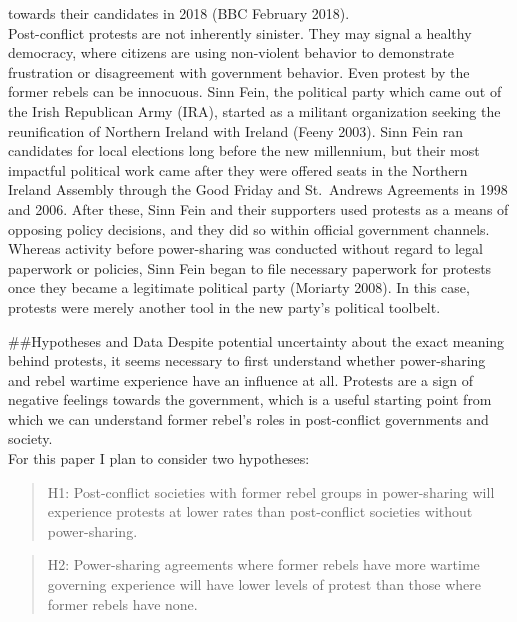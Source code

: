 \documentclass[11pt,]{article}
\begin{document}
towards their candidates in 2018 (BBC February 2018).\\
Post-conflict protests are not inherently sinister. They may signal a
healthy democracy, where citizens are using non-violent behavior to
demonstrate frustration or disagreement with government behavior. Even
protest by the former rebels can be innocuous. Sinn Fein, the political
party which came out of the Irish Republican Army (IRA), started as a
militant organization seeking the reunification of Northern Ireland with
Ireland (Feeny 2003). Sinn Fein ran candidates for local elections long
before the new millennium, but their most impactful political work came
after they were offered seats in the Northern Ireland Assembly through
the Good Friday and St.~Andrews Agreements in 1998 and 2006. After
these, Sinn Fein and their supporters used protests as a means of
opposing policy decisions, and they did so within official government
channels. Whereas activity before power-sharing was conducted without
regard to legal paperwork or policies, Sinn Fein began to file necessary
paperwork for protests once they became a legitimate political party
(Moriarty 2008). In this case, protests were merely another tool in the
new party's political toolbelt.

\#\#Hypotheses and Data Despite potential uncertainty about the exact
meaning behind protests, it seems necessary to first understand whether
power-sharing and rebel wartime experience have an influence at all.
Protests are a sign of negative feelings towards the government, which
is a useful starting point from which we can understand former rebel's
roles in post-conflict governments and society.\\
For this paper I plan to consider two hypotheses:

\begin{quote}
H1: Post-conflict societies with former rebel groups in power-sharing
will experience protests at lower rates than post-conflict societies
without power-sharing.
\end{quote}

\begin{quote}
H2: Power-sharing agreements where former rebels have more wartime
governing experience will have lower levels of protest than those where
former rebels have none.
\end{quote}
\end{document}
